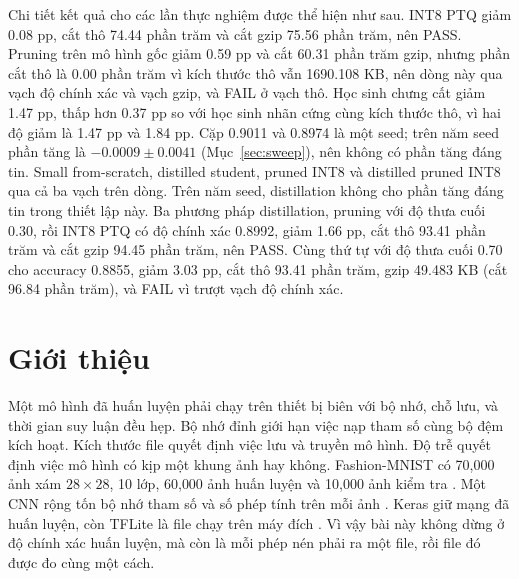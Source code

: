 \documentclass[13pt,a4paper]{article}
\begin{document}
Chi tiết kết quả cho các lần thực nghiệm được thể hiện như sau.
INT8 PTQ giảm 0.08 pp, cắt thô 74.44 phần trăm và cắt gzip 75.56 phần trăm, nên PASS.
Pruning trên mô hình gốc giảm 0.59 pp và cắt 60.31 phần trăm gzip, nhưng phần cắt thô là 0.00 phần trăm vì kích thước thô vẫn 1690.108 KB, nên dòng này qua vạch độ chính xác và vạch gzip, và FAIL ở vạch thô.
Học sinh chưng cất giảm 1.47 pp, thấp hơn 0.37 pp so với học sinh nhãn cứng cùng kích thước thô, vì hai độ giảm là 1.47 pp và 1.84 pp.
Cặp 0.9011 và 0.8974 là một seed; trên năm seed phần tăng là \(-0.0009 \pm 0.0041\) (Mục~\ref{sec:sweep}), nên không có phần tăng đáng tin.
Small from-scratch, distilled student, pruned INT8 và distilled pruned INT8 qua cả ba vạch trên dòng.
Trên năm seed, distillation không cho phần tăng đáng tin trong thiết lập này.
Ba phương pháp distillation, pruning với độ thưa cuối 0.30, rồi INT8 PTQ có độ chính xác 0.8992, giảm 1.66 pp, cắt thô 93.41 phần trăm và cắt gzip 94.45 phần trăm, nên PASS.
Cùng thứ tự với độ thưa cuối 0.70 cho accuracy 0.8855, giảm 3.03 pp, cắt thô 93.41 phần trăm, gzip 49.483 KB (cắt 96.84 phần trăm), và FAIL vì trượt vạch độ chính xác.

\section{Giới thiệu}

Một mô hình đã huấn luyện phải chạy trên thiết bị biên với bộ nhớ, chỗ lưu, và thời gian suy luận đều hẹp.
Bộ nhớ đỉnh giới hạn việc nạp tham số cùng bộ đệm kích hoạt.
Kích thước file quyết định việc lưu và truyền mô hình.
Độ trễ quyết định việc mô hình có kịp một khung ảnh hay không.
Fashion-MNIST có 70{,}000 ảnh xám \(28\times 28\), 10 lớp, 60{,}000 ảnh huấn luyện và 10{,}000 ảnh kiểm tra \cite{xiao2017}.
Một CNN rộng tốn bộ nhớ tham số và số phép tính trên mỗi ảnh \cite{goodfellow2016}.
Keras giữ mạng đã huấn luyện, còn TFLite là file chạy trên máy đích \cite{chollet2021}.
Vì vậy bài này không dừng ở độ chính xác huấn luyện, mà còn là
mỗi phép nén phải ra một file, rồi file đó được đo cùng một cách.
\end{document}
